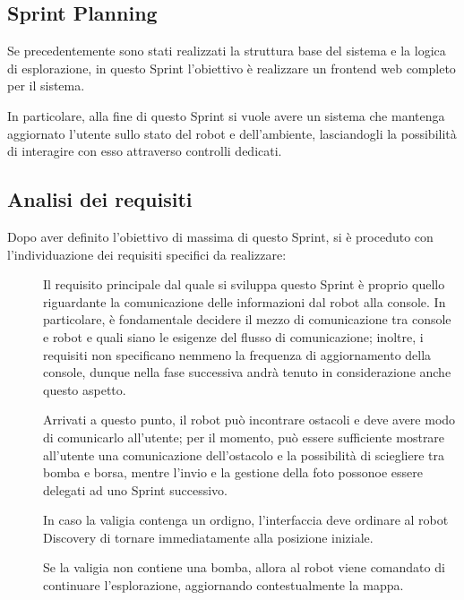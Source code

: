 \subsection{Sprint Planning}

Se precedentemente sono stati realizzati la struttura base del sistema e la logica di esplorazione,
in questo Sprint l'obiettivo è realizzare un frontend web completo per il sistema.

In particolare, alla fine di questo Sprint si vuole avere un sistema che mantenga aggiornato l'utente sullo stato del robot e dell'ambiente,
lasciandogli la possibilità di interagire con esso attraverso controlli dedicati.

\subsection{Analisi dei requisiti}

Dopo aver definito l'obiettivo di massima di questo Sprint, si è proceduto con l'individuazione dei requisiti specifici da realizzare:

\begin{description}
  \item[]
    Il requisito principale dal quale si sviluppa questo Sprint è proprio quello riguardante la comunicazione delle informazioni dal robot alla console.
    In particolare, è fondamentale decidere il mezzo di comunicazione tra console e robot e quali siano le esigenze del flusso di comunicazione;
    inoltre, i requisiti non specificano nemmeno la frequenza di aggiornamento della console, dunque nella fase successiva andrà tenuto in considerazione anche questo aspetto.

  \item[]
    Arrivati a questo punto, il robot può incontrare ostacoli e deve avere modo di comunicarlo all'utente;
    per il momento, può essere sufficiente mostrare all'utente una comunicazione dell'ostacolo e la possibilità di sciegliere tra bomba e borsa,
    mentre l'invio e la gestione della foto possonoe essere delegati ad uno Sprint successivo.

  \item[]
    In caso la valigia contenga un ordigno, l'interfaccia deve ordinare al robot Discovery di tornare immediatamente alla posizione iniziale.

  \item[]
    Se la valigia non contiene una bomba, allora al robot viene comandato di continuare l'esplorazione, aggiornando contestualmente la mappa.
\end{description}

